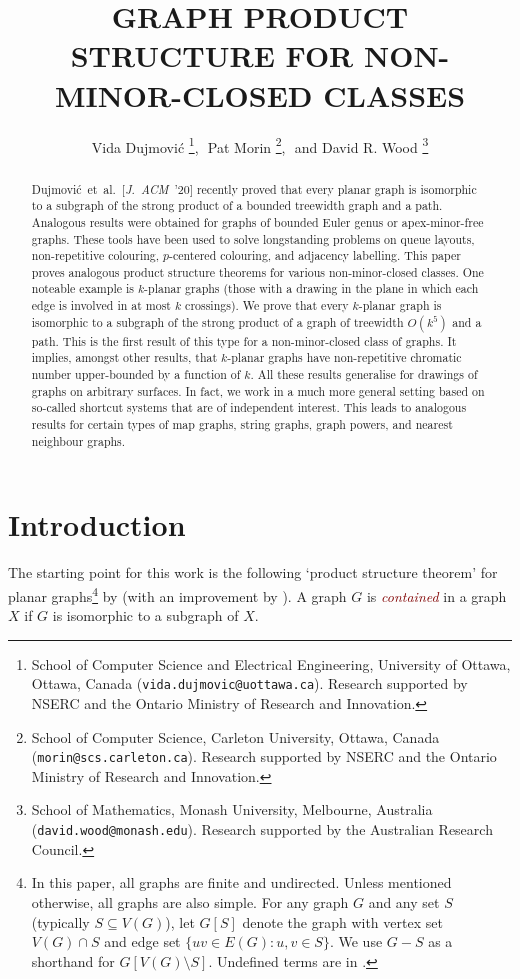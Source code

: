 \documentclass{patmorin}
\title{\MakeUppercase{Graph Product Structure for Non-Minor-Closed Classes}}
\author{%
Vida Dujmovi\'c%
\thanks{School of Computer Science and Electrical Engineering, University of Ottawa, Ottawa, Canada (\texttt{vida.dujmovic@uottawa.ca}). Research supported by NSERC and the Ontario Ministry of Research and Innovation.},\,\,
Pat Morin%
\thanks{School of Computer Science, Carleton University, Ottawa, Canada (\texttt{morin@scs.carleton.ca}). Research  supported by NSERC and the Ontario Ministry of Research and Innovation.},\,\, and
David R. Wood%
\thanks{School of Mathematics, Monash University, Melbourne, Australia (\texttt{david.wood@monash.edu}). Research supported by the Australian Research Council.}
}
\theoremstyle{plain}
\theoremstyle{definition}
\newcommand{\defin}[1]{\textcolor{Maroon}{\emph{#1}}}
\newcommand{\note}[2]{\noindent{\color{red}[#1:~#2]}}
\begin{document}
\begin{titlepage}
\maketitle

\begin{abstract}
Dujmovi\'c~et~al.~[\emph{J.~ACM}~'20] recently proved that every planar graph is isomorphic to a subgraph of the strong product of a bounded treewidth graph and a path. Analogous results were obtained for graphs of bounded Euler genus or apex-minor-free graphs. These tools have been used to solve longstanding problems on queue layouts, non-repetitive colouring, $p$-centered colouring, and adjacency labelling. This paper proves analogous product structure theorems for various non-minor-closed classes. One noteable example is $k$-planar graphs (those with a drawing in the plane in which each edge is involved in at most $k$ crossings). We prove that every $k$-planar graph is isomorphic to a subgraph of the strong product of a graph of treewidth $O(k^5)$ and a path. This is the first result of this type for a non-minor-closed class of graphs. It implies, amongst other results, that $k$-planar graphs have non-repetitive chromatic number upper-bounded by a function of $k$. All these results generalise for drawings of graphs on arbitrary surfaces. In fact, we work in a much more general setting based on so-called shortcut systems that are of independent interest. This leads to analogous results for certain types of map graphs, string graphs, graph powers, and nearest neighbour graphs.
\end{abstract}
\end{titlepage}
\tableofcontents
\newpage

\section{Introduction}
\label{Introduction}


The starting point for this work is the following `product structure theorem' for planar graphs\footnote{In this paper, all graphs are finite and undirected. Unless mentioned otherwise, all graphs are also simple. For any graph $G$ and any set $S$ (typically $S\subseteq V(G)$), let $G[S]$  denote the graph with vertex set $V(G)\cap S$ and edge set $\{uv\in E(G) : u,v\in S\}$.  We use $G-S$ as a shorthand for $G[V(G)\setminus S]$. Undefined terms are in \citep{Diestel5}.} by \citet{DJMMUW20} (with an improvement by \citet{UWY}). A graph $G$ is \defin{contained} in a graph $X$ if $G$ is isomorphic to a subgraph of $X$.
\end{document}

